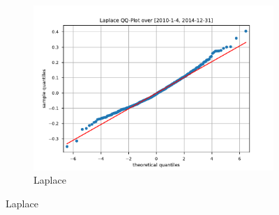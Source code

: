 \begin{figure}[htbp]
\begin{subfigure}[b]{0.32\textwidth}
        \includegraphics[width=\textwidth]{content/reschap4/Figures/laplace_QQ_2010-1-4-2014-12-31.pdf}
        \caption{\small Laplace}
    \end{subfigure}


\end{figure}
